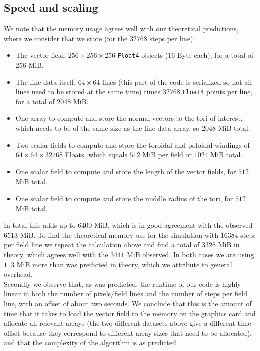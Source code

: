 \documentclass[a4paper]{article}
\begin{document}
\subsection{Speed and scaling}
We note that the memory usage agrees well with our theoretical predictions, where we consider that we store (for the $32768$ steps per line):
\begin{itemize}
	\item The vector field, $256\times256\times256$ \texttt{Float4} objects ($16$ Byte each), for a total of $256$ MiB.
\item The line data itself, $64\times 64$ lines (this part of the code is serialized so not all lines need to be stored at the same time) times $32768$ \texttt{Float4} points per line, for a total of $2048$ MiB.
\item One array to compute and store the normal vectors to the tori of interest, which needs to be of the same size as the line data array, so $2048$ MiB total.
\item Two scalar fields to compute and store the toroidal and poloidal windings of $64\times 64\times 32768$ Floats, which equals $512$ MiB per field or $1024$ MiB total.
\item One scalar field to compute and store the length of the vector fields, for $512$ MiB total.
\item One scalar field to compute and store the middle radius of the tori, for $512$ MiB total.
\end{itemize}
In total this adds up to $6400$ MiB, which is in good agreement with the observed $6513$ MiB. 
To find the theoretical memory use for the simulation with $16384$ steps per field line we repeat the calculation above and find a total of $3328$ MiB in theory, which agrees well with the $3441$ MiB observed. 
In both cases we are using $113$ MiB more than was predicted in theory, which we attribute to general overhead.\\

Secondly we observe that, as was predicted, the runtime of our code is highly linear in both the number of pixels/field lines and the number of steps per field line, with an offset of about two seconds. 
We conclude that this is the amount of time that it takes to load the vector field to the memory on the graphics card and allocate all relevant arrays (the two different datasets above give a different time offset because they correspond to different array sizes that need to be allocated), and that the complexity of the algorithm is as predicted.
\end{document}
